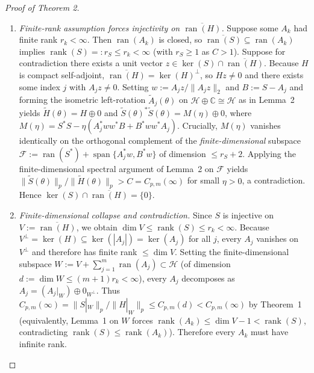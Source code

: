 \documentclass[10pt,letterpaper]{article}
\newcommand{\C}{\mathbb{C}}
\newcommand{\Hilb}{\mathcal{H}}
\newcommand{\ran}{\operatorname{ran}}
\newcommand{\rank}{\operatorname{rank}}
\begin{document}
\begin{proof}[Proof of Theorem 2]
\begin{enumerate}[leftmargin=1.6em,itemsep=2.5pt]
  \item \emph{Finite-rank assumption forces injectivity on $\overline{\ran(H)}$.} Suppose some $A_k$ had finite rank $r_k < \infty$. Then $\ran(A_k)$ is closed, so $\overline{\ran(S)} \subseteq \ran(A_k)$ implies $\rank(S) =: r_S \le r_k < \infty$ (with $r_S \ge 1$ as $C > 1$). Suppose for contradiction there exists a unit vector $z \in \ker(S) \cap \overline{\ran(H)}$. Because $H$ is compact self-adjoint, $\overline{\ran(H)} = \ker(H)^\perp$, so $Hz \neq 0$ and there exists some index $j$ with $A_j z \neq 0$. Setting $w := A_j z / \|A_j z\|_2$ and $B := S - A_j$ and forming the isometric left-rotation $\widetilde{A}_j(\theta)$ on $\Hilb \oplus \C \cong \Hilb$ as in Lemma~2 yields $\widetilde{H}(\theta) = H \oplus 0$ and $\widetilde{S}(\theta)^* \widetilde{S}(\theta) = M(\eta) \oplus 0$, where $M(\eta) = S^* S - \eta(A_j^* w w^* B + B^* w w^* A_j)$. Crucially, $M(\eta)$ vanishes identically on the orthogonal complement of the \emph{finite-dimensional} subspace $\mathcal{F} := \ran(S^*) + \operatorname{span}\{A_j^* w, B^* w\}$ of dimension $\le r_S + 2$. Applying the finite-dimensional spectral argument of Lemma~2 on $\mathcal{F}$ yields $\|\widetilde{S}(\theta)\|_p / \|\widetilde{H}(\theta)\|_p > C = C_{p,m}(\infty)$ for small $\eta > 0$, a contradiction. Hence $\ker(S) \cap \overline{\ran(H)} = \{0\}$.
  \item \emph{Finite-dimensional collapse and contradiction.} Since $S$ is injective on $V := \overline{\ran(H)}$, we obtain $\dim V \le \rank(S) \le r_k < \infty$. Because $V^\perp = \ker(H) \subseteq \ker(|A_j|) = \ker(A_j)$ for all $j$, every $A_j$ vanishes on $V^\perp$ and therefore has finite rank $\le \dim V$. Setting the finite-dimensional subspace $W := V + \sum_{j=1}^m \ran(A_j) \subset \Hilb$ (of dimension $d := \dim W \le (m+1)r_k < \infty$), every $A_j$ decomposes as $A_j = (A_j|_W) \oplus 0_{W^\perp}$. Thus $C_{p,m}(\infty) = \|S|_W\|_p / \|H|_W\|_p \le C_{p,m}(d) < C_{p,m}(\infty)$ by Theorem~1 (equivalently, Lemma~1 on $W$ forces $\rank(A_k) \le \dim V - 1 < \rank(S)$, contradicting $\rank(S) \le \rank(A_k)$). Therefore every $A_k$ must have infinite rank.
\end{enumerate}
\end{proof}
\end{document}

